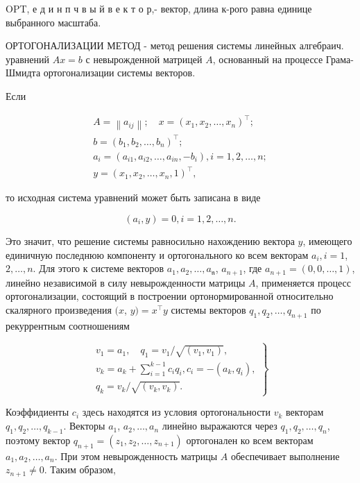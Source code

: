 \documentclass[10pt]{article}
\begin{document}
OPT, е д и н п ч в ы й в е к т о р,- вектор, длина к-рого равна единице выбранного масштаба.

ОРТОГОНАЛИЗАЦИИ МЕТОД - метод решения системы линейных алгебраич. уравнений $A x=b$ с невырожденной матрицей $A$, основанный на процессе Грама-Шмидта ортогонализации системы векторов.

Если

\[
\begin{gathered}
A=\left\|a_{i j}\right\| ; \quad x=\left(x_{1}, x_{2}, \ldots, x_{n}\right)^{\top} ; \\
b=\left(b_{1}, b_{2}, \ldots, b_{n}\right)^{\top} ; \\
a_{i}=\left(a_{i 1}, a_{i 2}, \ldots, a_{i n},-b_{i}\right), i=1,2, \ldots, n ; \\
y=\left(x_{1}, x_{2}, \ldots, x_{n}, 1\right)^{\top},
\end{gathered}
\]

то исходная система уравнений может быть записана в виде

\[
\left(a_{i}, y\right)=0, i=1,2, \ldots, n .
\]

Это значит, что решение системы равносильно нахождению вектора $y$, имеющего единичную последнюю компоненту и ортогонального ко всем векторам $a_{i}, i=1$, $2, \ldots, n$. Для этого к системе векторов $a_{1}, a_{2}, \ldots, a_{\mathfrak{n}}$, $a_{n+1}$, где $a_{n+1}=(0,0, \ldots, 1)$, линейно независимой в силу невырожденности матрицы $A$, применяется процесс ортогонализации, состоящий в построении ортонормированной относительно скалярного произведения $(x$, $y)=x^{\top} y$ системы векторов $q_{1}, q_{2}, \ldots, q_{n+1}$ по рекуррентным соотношениям

\[
\left.\begin{array}{c}
v_{1}=a_{1}, \quad q_{1}=v_{1} / \sqrt{\left(v_{1}, v_{1}\right)}, \\
v_{k}=a_{k}+\sum_{i=1}^{k-1} c_{i} q_{i}, c_{i}=-\left(a_{k}, q_{i}\right), \\
q_{k}=v_{k} / \sqrt{\left(v_{k}, v_{k}\right)} .
\end{array}\right\}
\]

Коэффидиенты $c_{i}$ здесь находятся из условия ортогональности $v_{k}$ векторам $q_{1}, q_{2}, \ldots, q_{k-1}$. Векторы $a_{1}$, $a_{2}, \ldots, a_{n}$ линейно выражаются через $q_{1}, q_{2}, \ldots, q_{n}$, поэтому вектор $q_{n+1}=\left(z_{1}, z_{2}, \ldots, z_{n+1}\right)$ ортогонален ко всем векторам $a_{1}, a_{2}, \ldots, a_{n}$. При этом невырожденность матрицы $A$ обеспечивает выполнение $z_{n+1} \neq 0$. Таким образом,
\end{document}
